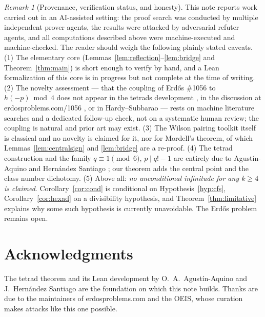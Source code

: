 \documentclass[11pt]{article}
\theoremstyle{definition}
\theoremstyle{remark}
\newtheorem{remark}[theorem]{Remark}
\begin{document}
\begin{remark}[Provenance, verification status, and honesty]
\label{rem:provenance}
This note reports work carried out in an AI-assisted setting: the proof
search was conducted by multiple independent prover agents, the results were
attacked by adversarial refuter agents, and all computations described above
were machine-executed and machine-checked. The reader should weigh the
following plainly stated caveats. (1) The elementary core
(Lemmas~\ref{lem:reflection}--\ref{lem:bridge} and
Theorem~\ref{thm:main}) is short enough to verify by hand, and a Lean
formalization of this core is in progress but not complete at the time of
writing. (2) The novelty assessment --- that the coupling of Erd\H{o}s
\#1056 to $h(-p) \bmod 4$ does not appear in the tetrads development
\cite{AAHS}, in the discussion at erdosproblems.com/1056 \cite{EP}, or in
Hardy--Subbarao \cite{HS} --- rests on machine literature searches and a
dedicated follow-up check, not on a systematic human review; the coupling
is natural and prior art may exist. (3) The Wilson pairing toolkit itself is
classical and no novelty is claimed for it, nor for Mordell's theorem, of
which Lemmas~\ref{lem:centralsign} and \ref{lem:bridge} are a re-proof.
(4) The tetrad construction and the family $q \equiv 1 \pmod 6$,
$p \mid q!-1$ are entirely due to Agust\'in-Aquino and Hern\'andez
Santiago \cite{AAHS}; our theorem adds the central point and the class
number dichotomy. (5) Above all: \emph{no unconditional infinitude for any
$k \ge 4$ is claimed}. Corollary~\ref{cor:cond} is conditional on
Hypothesis~\ref{hyp:cfs}, Corollary~\ref{cor:hexad} on a divisibility
hypothesis, and Theorem~\ref{thm:limitative} explains why some such
hypothesis is currently unavoidable. The Erd\H{o}s problem remains open.
\end{remark}

\section*{Acknowledgments}
The tetrad theorem and its Lean development by O.~A.~Agust\'in-Aquino and
J.~Hern\'andez Santiago \cite{AAHS} are the foundation on which this note
builds. Thanks are due to the maintainers of erdosproblems.com and the OEIS,
whose curation makes attacks like this one possible.
\end{document}
